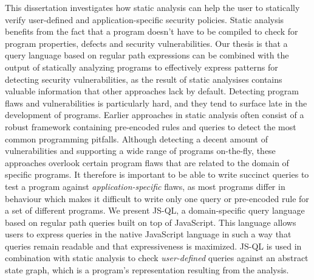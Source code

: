 \setcounter{page}{1}




This dissertation investigates how static analysis can help the user to statically verify user-defined and application-specific security policies. Static analysis benefits from the fact that a program doesn't have to be compiled to check for program properties, defects and security vulnerabilities. Our thesis is that a query language based on regular path expressions can be combined with the output of statically analyzing programs to effectively express patterns for detecting security vulnerabilities, as the result of static analysises contains valuable information that other approaches lack by default. Detecting program flaws and vulnerabilities is particularly hard, and they tend to surface late in the development of programs. Earlier approaches in static analysis often consist of a robust framework containing pre-encoded rules and queries to detect the most common programming pitfalls. Although detecting a decent amount of vulnerabilities and supporting a wide range of programs on-the-fly, these approaches overlook certain program flaws that are related to the domain of specific programs. It therefore is important to be able to write succinct queries to test a program against \textit{application-specific} flaws, as most programs differ in behaviour which makes it difficult to write only one query or pre-encoded rule for a set of different programs. We present JS-QL, a domain-specific query language based on regular path queries built on top of JavaScript. This language allows users to express queries in the native JavaScript language in such a way that queries remain readable and that expressiveness is maximized. JS-QL is used in combination with static analysis to check \textit{user-defined} queries against an abstract state graph, which is a program's representation resulting from the analysis.


